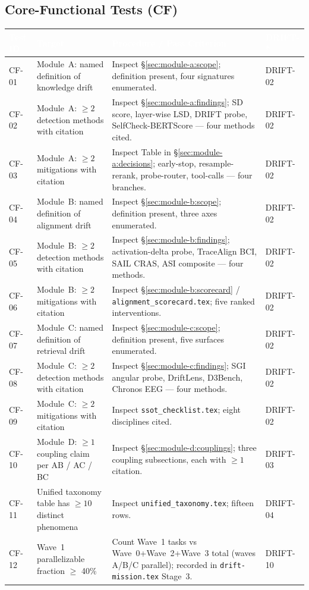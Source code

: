 \documentclass[11pt,letterpaper]{article}
\newcommand{\tableheader}[1]{\textbf{\sffamily\textcolor{white}{#1}}}
\begin{document}
\subsection{Core-Functional Tests (CF)}
\label{sec:test-plan:cf}

\begin{center}
\small
\begin{tabularx}{\textwidth}{L{1.8cm}L{4.4cm}XL{1.8cm}}
\toprule
{}
\tableheader{Test ID} & \tableheader{Target} & \tableheader{Procedure / Pass Criterion} & \tableheader{DRIFT-*} \\
\midrule
CF-01 & Module~A: named definition of knowledge drift & Inspect \S\ref{sec:module-a:scope}; definition present, four signatures enumerated. & DRIFT-02 \\
CF-02 & Module~A: $\geq 2$ detection methods with citation & Inspect \S\ref{sec:module-a:findings}; SD score, layer-wise LSD, DRIFT probe, SelfCheck-BERTScore --- four methods cited. & DRIFT-02 \\
CF-03 & Module~A: $\geq 2$ mitigations with citation & Inspect Table in \S\ref{sec:module-a:decisions}; early-stop, resample-rerank, probe-router, tool-calls --- four branches. & DRIFT-02 \\
CF-04 & Module~B: named definition of alignment drift & Inspect \S\ref{sec:module-b:scope}; definition present, three axes enumerated. & DRIFT-02 \\
CF-05 & Module~B: $\geq 2$ detection methods with citation & Inspect \S\ref{sec:module-b:findings}; activation-delta probe, TraceAlign BCI, SAIL CRAS, ASI composite --- four methods. & DRIFT-02 \\
CF-06 & Module~B: $\geq 2$ mitigations with citation & Inspect \S\ref{sec:module-b:scorecard} / \texttt{alignment\_scorecard.tex}; five ranked interventions. & DRIFT-02 \\
CF-07 & Module~C: named definition of retrieval drift & Inspect \S\ref{sec:module-c:scope}; definition present, five surfaces enumerated. & DRIFT-02 \\
CF-08 & Module~C: $\geq 2$ detection methods with citation & Inspect \S\ref{sec:module-c:findings}; SGI angular probe, DriftLens, D3Bench, Chronos EEG --- four methods. & DRIFT-02 \\
CF-09 & Module~C: $\geq 2$ mitigations with citation & Inspect \texttt{ssot\_checklist.tex}; eight disciplines cited. & DRIFT-02 \\
CF-10 & Module~D: $\geq 1$ coupling claim per AB / AC / BC & Inspect \S\ref{sec:module-d:couplings}; three coupling subsections, each with $\geq 1$ citation. & DRIFT-03 \\
CF-11 & Unified taxonomy table has $\geq 10$ distinct phenomena & Inspect \texttt{unified\_taxonomy.tex}; fifteen rows. & DRIFT-04 \\
CF-12 & Wave~1 parallelizable fraction $\geq$ 40\% & Count Wave~1 tasks vs Wave~0+Wave~2+Wave~3 total (waves A/B/C parallel); recorded in \texttt{drift-mission.tex} Stage~3. & DRIFT-10 \\
\bottomrule
\end{tabularx}
\end{center}
\end{document}
